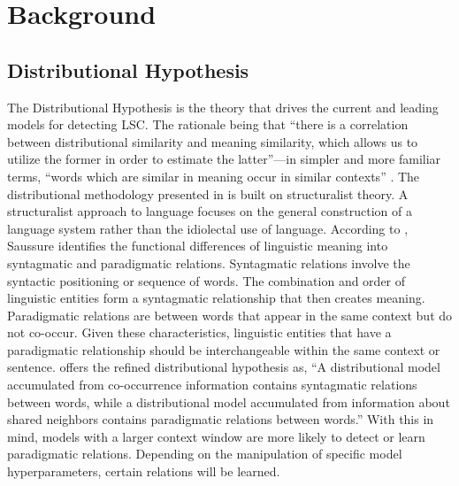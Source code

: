\section{Background}
\label{sec:background}

\subsection{Distributional Hypothesis}

The Distributional Hypothesis is the theory that drives the current and leading models for detecting LSC. The rationale being that “there is a correlation between distributional similarity and meaning similarity, which allows us to utilize the former in order to estimate the latter”—in simpler and more familiar terms, “words which are similar in meaning occur in similar contexts” \citep{sahlgren2008distributional}. The distributional methodology presented in \citet{harris1970distributional} is built on structuralist theory. A structuralist approach to language focuses on the general construction of a language system rather than the idiolectal use of language. According to \citet{sahlgren2008distributional}, Saussure identifies the functional differences of linguistic meaning into syntagmatic and paradigmatic relations. Syntagmatic relations involve the syntactic positioning or sequence of words. The combination and order of linguistic entities form a syntagmatic relationship that then creates meaning. Paradigmatic relations are between words that appear in the same context but do not co-occur. Given these characteristics, linguistic entities that have a paradigmatic relationship should be interchangeable within the same context or sentence. \citet{sahlgren2008distributional} offers the refined distributional hypothesis as, “A distributional model accumulated from co-occurrence information contains syntagmatic relations between words, while a distributional model accumulated from information about shared neighbors contains paradigmatic relations between words.” With this in mind, models with a larger context window are more likely to detect or learn paradigmatic relations. Depending on the manipulation of specific model hyperparameters, certain relations will be learned. 



